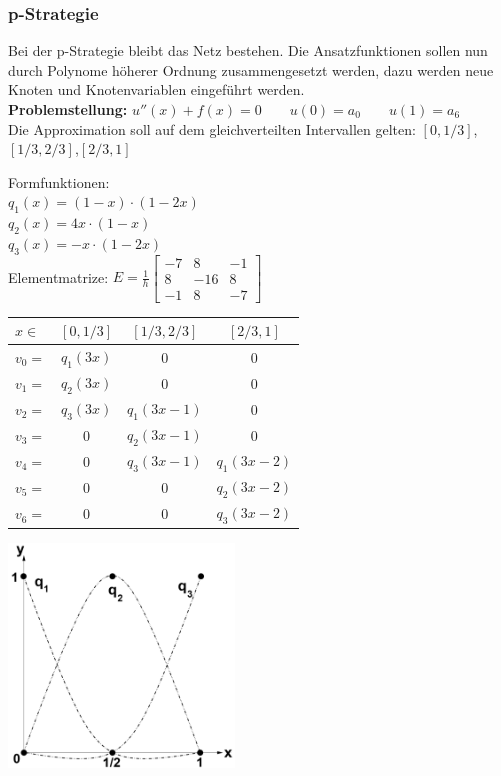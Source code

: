 \subsubsection{p-Strategie}
Bei der p-Strategie bleibt das Netz bestehen. Die Ansatzfunktionen sollen nun durch Polynome höherer Ordnung zusammengesetzt werden, dazu werden neue Knoten und Knotenvariablen eingeführt werden.\\

\textbf{Problemstellung:} $u''(x)+f(x)=0\qquad u(0)=a_0\qquad u(1)=a_6$\\

Die Approximation soll auf dem gleichverteilten Intervallen gelten: $[0,1/3]$,\quad $[1/3,2/3]$,\quad $[2/3,1]$\\

\begin{minipage}{4cm}
	Formfunktionen:\\

	$q_1(x)=(1-x)\cdot(1-2x)$\\
	$q_2(x)=4x\cdot(1-x)$\\
	$q_3(x)=-x\cdot(1-2x)$\\
	
	Elementmatrize: $\boxed{E=\frac{1}{h}
	\begin{bmatrix}
		-7& 8 & -1\\
		8& -16& 8\\
		-1& 8& -7	
	\end{bmatrix}}$\\
\end{minipage}
\hfill
\begin{minipage}{8cm}
	\begin{tabular}{lc|c|c}
		$x\in$&$[0,1/3]$&$[1/3,2/3]$&$[2/3,1]$\\
		\hline
		$v_0=$&$q_1(3x)$&$0$&$0$\\
		$v_1=$&$q_2(3x)$&$0$&$0$\\
		$v_2=$&$q_3(3x)$&$q_1(3x-1)$&$0$\\
		$v_3=$&$0$&$q_2(3x-1)$&$0$\\
		$v_4=$&$0$&$q_3(3x-1)$&$q_1(3x-2)$\\
		$v_5=$&$0$&$0$&$q_2(3x-2)$\\
		$v_6=$&$0$&$0$&$q_3(3x-2)$\\
	\end{tabular}
\end{minipage}
\hfill
\begin{minipage}{6cm}
\includegraphics[width=6cm]{Content/Numerik/FEM2Ord}
\end{minipage}\\

